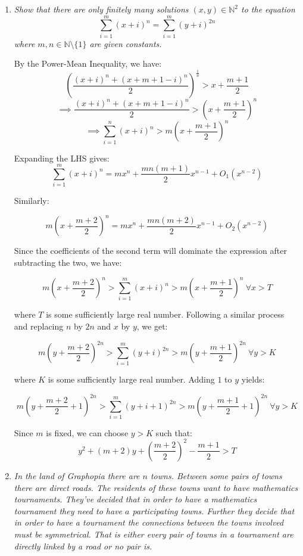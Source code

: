 \documentclass{article}
\begin{document}
\begin{enumerate}
\medskip
\item %
{\itshape Show that there are only finitely many solutions $(x, y) \in \mathbb{N}^2$ to the equation
$$\sum_{i = 1}^{m} (x + i)^n = \sum_{i = 1}^{m} (y + i)^{2n}$$
where $m, n \in \mathbb{N} \setminus \{1\}$ are given constants.}

By the Power-Mean Inequality, we have:
$$(\frac{(x + i)^n + (x + m + 1 - i)^n}{2})^{\frac{1}{n}} > x + \frac{m + 1}{2}$$
$$\implies \frac{(x + i)^n + (x + m + 1 - i)^n}{2} > (x + \frac{m + 1}{2})^n$$
$$\implies \sum_{i = 1}^{n} (x + i)^n > m(x + \frac{m + 1}{2})^n$$

Expanding the LHS gives:
$$\sum_{i = 1}^{m} (x + i)^n = mx^n + \frac{mn(m + 1)}{2}x^{n - 1} + O_1(x^{n - 2})$$

Similarly:

$$m(x + \frac{m + 2}{2})^n = mx^n + \frac{mn(m + 2)}{2}x^{n - 1} + O_2(x^{n - 2})$$

Since the coefficients of the second term will dominate the expression after subtracting the two, we have:

$$m(x + \frac{m + 2}{2})^n > \sum_{i = 1}^{m} (x + i)^n > m(x + \frac{m + 1}{2})^n ~\forall x > T$$

where $T$ is some sufficiently large real number. Following a similar process and replacing $n$ by $2n$ and $x$ by $y$, we get:

$$m(y + \frac{m + 2}{2})^{2n} > \sum_{i = 1}^{m} (y + i)^{2n} > m(y + \frac{m + 1}{2})^{2n} ~\forall y > K$$

where $K$ is some sufficiently large real number. Adding $1$ to $y$ yields:

$$m(y + \frac{m + 2}{2} + 1)^{2n} > \sum_{i = 1}^{m} (y + i + 1)^{2n} > m(y + \frac{m + 1}{2} + 1)^{2n} ~\forall y > K$$

Since $m$ is fixed, we can choose $y > K$ such that: 
$$y^2 + (m + 2)y + (\frac{m + 2}{2})^2 - \frac{m + 1}{2} > T$$

\medskip
\item %
{\itshape In the land of Graphopia there are $n$ towns. Between some pairs of towns there are direct roads. The residents of these towns want to have mathematics tournaments. They've decided that in order to have a mathematics tournament they need to have $a$ participating towns. Further they decide that in order to have a tournament the connections between the towns involved must be symmetrical. That is either every pair of towns in a tournament are directly linked by a road or no pair is. 

}
\end{enumerate}
\end{document}
